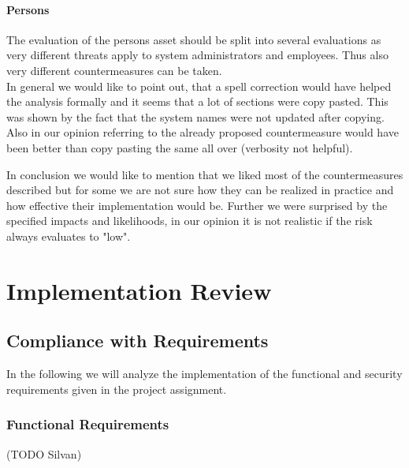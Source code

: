 \documentclass[english]{article}
\begin{document}
\paragraph{Persons}
The evaluation of the persons asset should be split into several evaluations as very different threats apply to system administrators and employees. Thus also very different countermeasures can be taken.
\\

In general we would like to point out, that a spell correction would have helped the analysis formally and it seems that a lot of sections were copy pasted. This was shown by the fact that the system names were not updated after copying. Also in our opinion referring to the already proposed countermeasure would have been better than copy pasting the same all over (verbosity not helpful).  

In conclusion we would like to mention that we liked most of the countermeasures described but for some we are not sure how they can be realized in practice and how effective their implementation would be. Further we were surprised by the specified impacts and likelihoods, in our opinion it is not realistic if the risk always evaluates to "low".
	

\section{Implementation Review}
 
\subsection{Compliance with Requirements} 

In the following we will analyze the implementation of the functional and security requirements given in the project assignment.

\subsubsection{Functional Requirements} (TODO Silvan)
\end{document}
